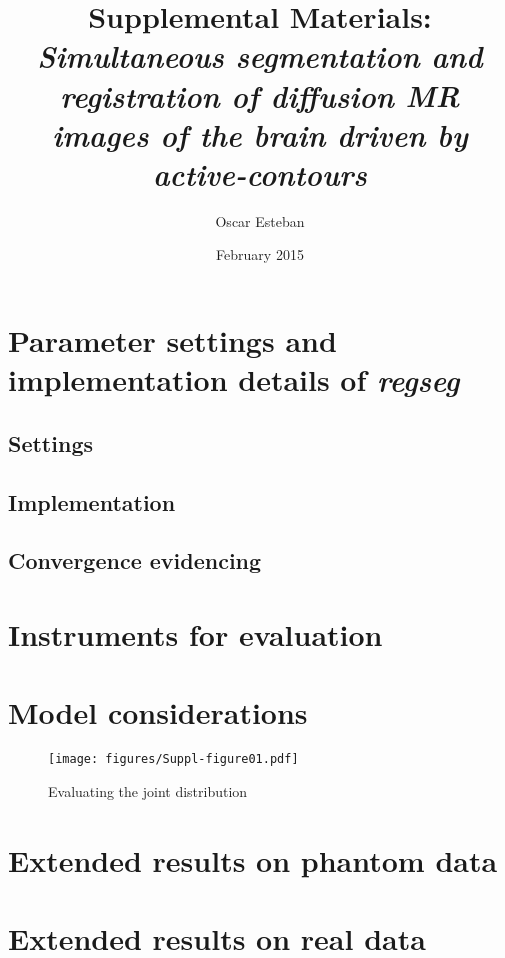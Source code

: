 \documentclass[a4paper,notitlepage]{report}
\begin{document}
\title{Supplemental Materials: \emph{Simultaneous segmentation and registration of
diffusion MR images of the brain driven by active-contours}}
\author{Oscar Esteban}
\date{February 2015}

\maketitle

\section{Parameter settings and implementation details of \emph{regseg}}

\subsection{Settings}

\subsection{Implementation}

\subsection{Convergence evidencing}

\section{Instruments for evaluation}

\section{Model considerations}

\begin{figure*}[h!]
	\texttt{[image: figures/Suppl-figure01.pdf]}
	\caption{Evaluating the joint distribution}\label{fig:jointplot}
\end{figure*}

\section{Extended results on phantom data}

\section{Extended results on real data}
\end{document}
